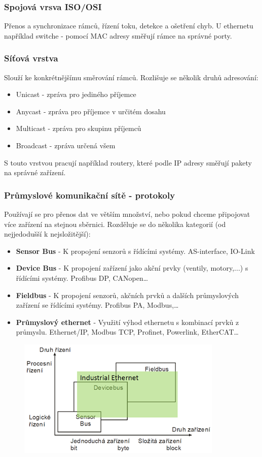 \subsubsection*{Spojová vrsva ISO/OSI}
Přenos a synchronizace rámců, řízení toku, detekce a ošetření chyb. U ethernetu například switche - pomocí MAC adresy směřují rámce na správné porty.

\subsubsection*{Síťová vrstva}
Slouží ke konkrétnějšímu směrování rámců. Rozlišuje se několik druhů adresování:
\begin{itemize}
  \item Unicast - zpráva pro jediného příjemce
  \item Anycast - zpráva pro příjemce v určitém dosahu
  \item Multicast - zpráva pro skupinu příjemců
  \item Broadcast - zpráva určená všem
\end{itemize}
S touto vrstvou pracují například routery, které podle IP adresy směřují pakety na správné zařízení.

\subsubsection*{Průmyslové komunikační sítě - protokoly}
Používají se pro přenos dat ve větším množství, nebo pokud chceme připojovat více zařízení na stejnou sběrnici.
Rozděluje se do několika kategorií (od nejjedodušší k nejsložitější):
\begin{itemize}
  \item \textbf{Sensor Bus} - K propojení senzorů s řídícími systémy. AS-interface, IO-Link
  \item \textbf{Device Bus} - K propojení zařízení jako akční prvky (ventily, motory,...) s řídícími systémy. Profibus DP, CANopen\dots
  \item \textbf{Fieldbus} - K propojení senzorů, akčních prvků a dalších průmyslových zařízení se řídícími systémy. Profibus PA, Modbus,\dots
  \item \textbf{Průmyslový ethernet} - Využití výhod ethernetu s kombinací prvků z průmyslu. Ethernet/IP, Modbus TCP, Profinet, Powerlink, EtherCAT\dots
\end{itemize}

\begin{figure}[h]
  \begin{center}
    \includegraphics[scale = 1]{img/Picture17.png}
  \end{center}
\end{figure}

